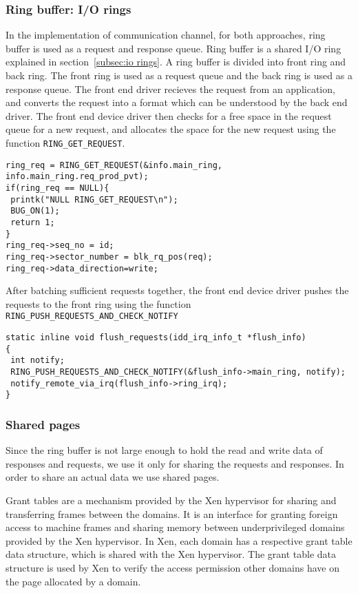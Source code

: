 \subsubsection*{Ring buffer: I/O rings}
\label{subsec:ringbuf}
In the implementation of communication channel, for both approaches, ring buffer is used as a request and response queue. Ring buffer is a shared I/O ring explained in section~\ref{subsec:io rings}. A ring buffer is divided into front ring and back ring. The front ring is used as a request queue and  the back ring is used as a response queue. The front end driver recieves the request from an application, and converts the request into a format which  can be understood by the back end driver. The front end device driver then checks for a free space in the request queue for a new request, and allocates the space for the new request using the function \texttt{RING\_GET\_REQUEST}. 
\begin{verbatim}
ring_req = RING_GET_REQUEST(&info.main_ring, info.main_ring.req_prod_pvt);
if(ring_req == NULL){
 printk("NULL RING_GET_REQUEST\n");
 BUG_ON(1);
 return 1;
}
ring_req->seq_no = id;
ring_req->sector_number = blk_rq_pos(req);
ring_req->data_direction=write;
\end{verbatim}
After batching sufficient requests together, the front end device driver pushes the requests to the front ring using the function \texttt{RING\_PUSH\_REQUESTS\_AND\_CHECK\_NOTIFY}
\begin{verbatim}
static inline void flush_requests(idd_irq_info_t *flush_info)
{
 int notify;
 RING_PUSH_REQUESTS_AND_CHECK_NOTIFY(&flush_info->main_ring, notify);
 notify_remote_via_irq(flush_info->ring_irq);
}
\end{verbatim}

\subsubsection*{Shared pages}
Since the ring buffer is not large enough to hold the read and write data of responses and requests, we use it only for sharing the requests and responses. In order to share an actual data we use shared pages. 

Grant tables are a mechanism provided by the Xen hypervisor for sharing and transferring frames between the domains. It is an interface for granting foreign access to machine frames and sharing memory between underprivileged domains provided by the Xen hypervisor. In Xen, each domain has a respective grant table data structure, which is shared with the Xen hypervisor. The grant table data structure is used by Xen to verify the access permission other domains have on the page allocated by a domain\cite{granttable}.

